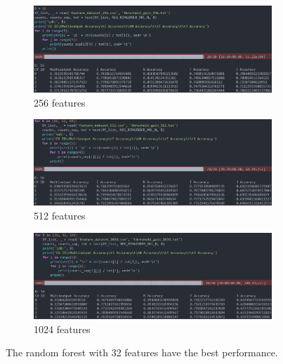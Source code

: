 \documentclass[UTF8, a4paper, 11pt]{article}
\begin{document}
\begin{figure}[H]
    \centering
    \includegraphics[width=0.8\textwidth]{256_16_gain.png}
    \caption{256 features}
\end{figure}
\begin{figure}[H]
    \centering
    \includegraphics[width=0.8\textwidth]{512_16_gain.png}
    \caption{512 features}
\end{figure}
\begin{figure}[H]
    \centering
    \includegraphics[width=0.8\textwidth]{1024_16_gain.png}
    \caption{1024 features}
\end{figure}
The random forest with 32 features have the best performance.
\end{document}
